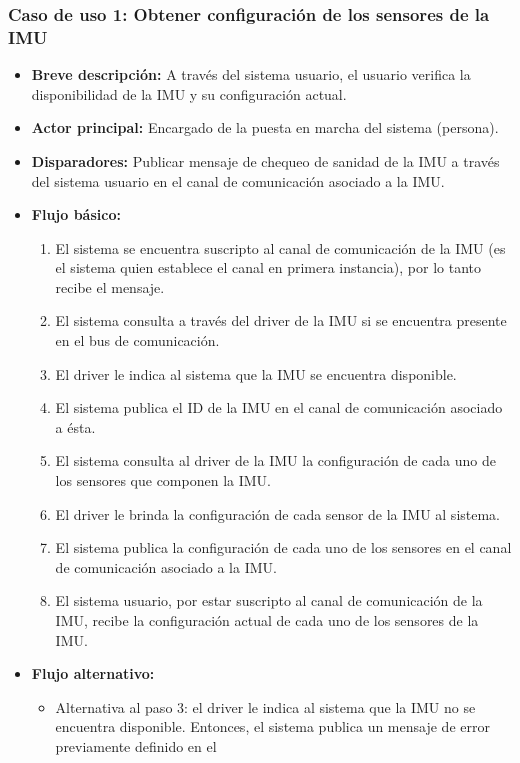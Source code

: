 \documentclass[12pt,a4paper, twosite]{article}
\begin{document}
\subsubsection*{Caso de uso 1: Obtener configuración de los sensores de la IMU}

\begin{itemize}
  \item \textbf{Breve descripción:} A través del sistema usuario, el usuario verifica la
  disponibilidad de la IMU y su configuración actual.
  \item \textbf{Actor principal:} Encargado de la puesta en marcha del sistema (persona).
  \item \textbf{Disparadores:} Publicar mensaje de chequeo de sanidad de la IMU a través del
  sistema usuario en el canal de comunicación asociado a la IMU.
  \item \textbf{Flujo básico:}
  \begin{enumerate}
    \item El sistema se encuentra suscripto al canal de comunicación de la IMU (es el sistema
    quien establece el canal en primera instancia), por lo tanto recibe el mensaje.
    \item El sistema consulta a través del driver de la IMU si se encuentra presente en el bus
    de comunicación.
    \item El driver le indica al sistema que la IMU se encuentra disponible.
    \item El sistema publica el ID de la IMU en el canal de comunicación asociado a ésta.
    \item El sistema consulta al driver de la IMU la configuración de cada uno de los
    sensores que componen la IMU.
    \item El driver le brinda la configuración de cada sensor de la IMU al sistema.
    \item El sistema publica la configuración de cada uno de los sensores en el canal de
    comunicación asociado a la IMU.
    \item El sistema usuario, por estar suscripto al canal de comunicación de la IMU,
    recibe la configuración actual de cada uno de los sensores de la IMU.
  \end{enumerate}
  \item \textbf{Flujo alternativo:}
  \begin{itemize}
    \item Alternativa al paso 3: el driver le indica al sistema que la IMU no se encuentra
    disponible. Entonces, el sistema publica un mensaje de error previamente definido en el

\end{itemize}
\end{itemize}
\end{document}
